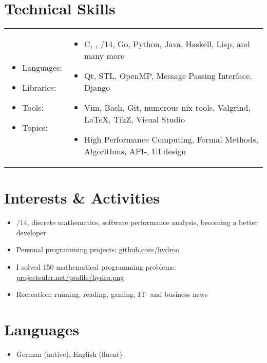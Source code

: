 \section*{Technical Skills}
\vspace{0.1cm} %
\begin{tabular}{l l}
	\begin{minipage}{0.18\textwidth}
		\begin{itemize}
			\item Languages:
			\item Libraries:
			\item Tools:
			\item Topics:
		\end{itemize}
	\end{minipage}
	&
	\begin{minipage}{0.80\textwidth}
		\begin{itemize}
			\item C, \cpp, \cpp11/14, Go, Python, Java, Haskell, Lisp, and many more
			\item Qt, STL, OpenMP, Message Passing Interface, Django
			\item Vim, Bash, Git, numerous \textasteriskcentered{}nix tools, Valgrind, \LaTeX, TikZ, Visual Studio
			\item High Performance Computing, Formal Methods, Algorithms, API-, UI design
		\end{itemize}
	\end{minipage}
\end{tabular}

\vspace{0.66cm} %

\pagebreak
\section*{Interests \& Activities}
\begin{itemize}
	\item {}/14, discrete mathematics, software performance analysis, becoming a better developer
	\item Personal programming projects: \href{https://github.com/hydroo}{github.com/hydroo}
	\item I solved 150 mathematical programming problems: \href{http://projecteuler.net/profile/hydro.png}{projecteuler.net/profile/hydro.png}
	\item Recreation: running, reading, gaming, IT- and business news
\end{itemize}

\customhrule
\section*{Languages}
\begin{itemize}
	\item German (native), English (fluent)
\end{itemize}


